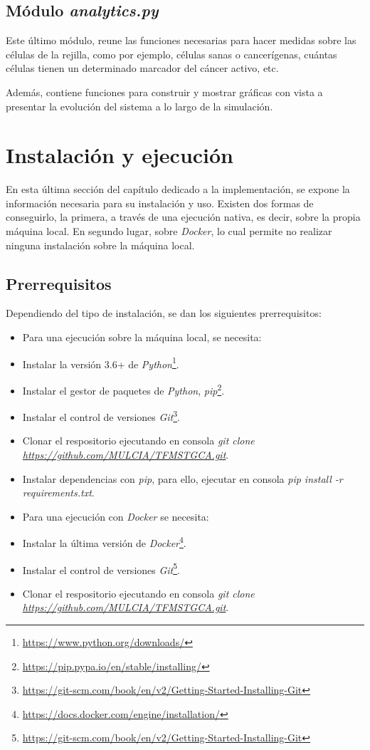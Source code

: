 \subsection{Módulo \textit{analytics.py}}

Este último módulo, reune las funciones necesarias para hacer medidas sobre las células
de la rejilla, como por ejemplo, células sanas o cancerígenas, cuántas células tienen un
determinado marcador del cáncer activo, etc.

Además, contiene funciones para construir y mostrar gráficas con vista a presentar la evolución
del sistema a lo largo de la simulación.

\section{Instalación y ejecución}

En esta última sección del capítulo dedicado a la implementación, se expone la información necesaria
para su instalación y uso. Existen dos formas de conseguirlo, la primera, a través de una ejecución
nativa, es decir, sobre la propia máquina local. En segundo lugar, sobre \textit{Docker}, lo cual permite
no realizar ninguna instalación sobre la máquina local.

\subsection{Prerrequisitos}

Dependiendo del tipo de instalación, se dan los siguientes prerrequisitos:

\begin{itemize}
  \item Para una ejecución sobre la máquina local, se necesita:
        \item Instalar la versión 3.6+ de \textit{Python}\footnote{\url{https://www.python.org/downloads/}}.
        \item Instalar el gestor de paquetes de \textit{Python}, \textit{pip}\footnote{\url{https://pip.pypa.io/en/stable/installing/}}.
        \item Instalar el control de versiones \textit{Git}\footnote{\url{https://git-scm.com/book/en/v2/Getting-Started-Installing-Git}}.
        \item Clonar el respositorio ejecutando en consola \textit{git clone \url{https://github.com/MULCIA/TFMSTGCA.git}}.
        \item Instalar dependencias con \textit{pip}, para ello, ejecutar en consola \textit{pip install -r requirements.txt}.
  \item Para una ejecución con \textit{Docker} se necesita:
        \item Instalar la última versión de \textit{Docker}\footnote{\url{https://docs.docker.com/engine/installation/}}.
        \item Instalar el control de versiones \textit{Git}\footnote{\url{https://git-scm.com/book/en/v2/Getting-Started-Installing-Git}}.
        \item Clonar el respositorio ejecutando en consola \textit{git clone \url{https://github.com/MULCIA/TFMSTGCA.git}}.
\end{itemize}

